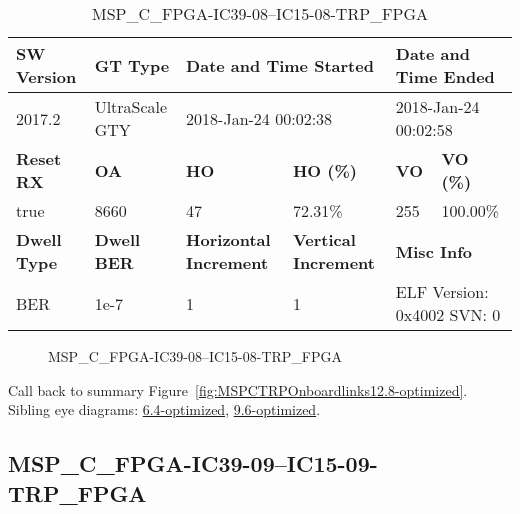 \begin{table}[h]
\centering
\caption{MSP\_C\_FPGA-IC39-08--IC15-08-TRP\_FPGA}
\label{tab:MSPCFPGAIC3908IC1508TRPFPGA12.8-optimized}
\begin{tabular}{@{}|l|l|l|l|l|l|@{}}
\toprule
\textbf{SW Version}                & \textbf{GT Type}   & \multicolumn{2}{l|}{\textbf{Date and Time Started}}            & \multicolumn{2}{l|}{\textbf{Date and Time Ended}}        \\ \midrule
2017.2                       & UltraScale GTY          & \multicolumn{2}{l|}{2018-Jan-24 00:02:38}                   & \multicolumn{2}{l|}{2018-Jan-24 00:02:58}               \\ \midrule
\textbf{Reset RX}                  & \textbf{OA} & \textbf{HO}   & \textbf{HO (\%)} & \textbf{VO} & \textbf{VO (\%)} \\ \midrule
true & 8660        & 47          & 72.31\%        & 255        & 100.00\%       \\ \midrule
\textbf{Dwell Type}                & \textbf{Dwell BER} & \textbf{Horizontal Increment} & \textbf{Vertical Increment}    & \multicolumn{2}{l|}{\textbf{Misc Info}}                  \\ \midrule
BER                            & 1e-7        & 1        & 1           & \multicolumn{2}{l|}{ELF Version: 0x4002 SVN: 0}                         \\ \bottomrule
\end{tabular}
\end{table}

\begin{figure}[h]
\caption{MSP\_C\_FPGA-IC39-08--IC15-08-TRP\_FPGA} \label{fig:MSPCFPGAIC3908IC1508TRPFPGA12.8-optimized}
\end{figure}

Call back to summary Figure~\ref{fig:MSPCTRPOnboardlinks12.8-optimized}.
Sibling eye diagrams: \hyperref[sec:MSPCFPGAIC3908IC1508TRPFPGA6.4-optimized]{6.4-optimized}, \hyperref[sec:MSPCFPGAIC3908IC1508TRPFPGA9.6-optimized]{9.6-optimized}.

\clearpage
\newpage


\subsection{MSP\_C\_FPGA-IC39-09--IC15-09-TRP\_FPGA}\label{sec:MSPCFPGAIC3909IC1509TRPFPGA12.8-optimized}

